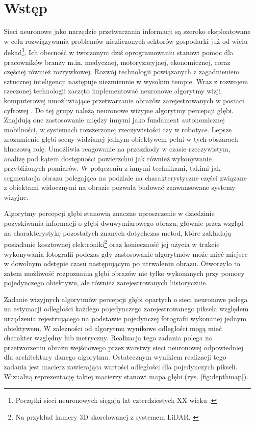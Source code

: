 \chapter{Wstęp}\label{chap:wstęp}

Sieci neuronowe jako narzędzie przetwarzania informacji są szeroko eksploatowane w celu rozwiązywania problemów niezliczonych sektorów gospodarki już od wielu dekad\footnote{Początki sieci neuronowych sięgają lat czterdziestych XX wieku \cite{mccullochpitts1943}.}. Ich obecność w tworzonym dziś oprogramowaniu stanowi pomoc dla pracowników branży m.in. medycznej, motoryzacyjnej, ekonomicznej, coraz częściej również rozrywkowej. Rozwój technologii powiązanych z zagadnieniem sztucznej inteligencji następuje niezmiennie w wysokim tempie. Wraz z rozwojem rzeczonej technologii zaczęto implementować neuronowe algorytmy wizji komputerowej umożliwiające przetwarzanie obrazów zarejestrowanych w postaci cyfrowej \cite{tadeusiewiczflasinski1991}. Do tej grupy należą neuronowe wizyjne algorytmy percepcji głębi. Znajdują one zastosowanie między innymi jako fundament autonomicznej mobilności, w systemach rozszerzonej rzeczywistości czy w robotyce. Lepsze zrozumienie głębi sceny widzianej jednym obiektywem pełni w tych obszarach kluczową rolę. Umożliwia reagowanie na przeszkody w czasie rzeczywistym, analizę pod kątem dostępności powierzchni jak również wykonywanie przybliżonych pomiarów. W połączeniu z innymi technikami, takimi jak segmentacja obrazu \cite{minaee2021} polegająca na podziale na charakterystyczne części związane z obiektami widocznymi na obrazie pozwala budować zaawansowane systemy wizyjne.

Algorytmy percepcji głębi stanowią znaczne uproszczenie w dziedzinie pozyskiwania informacji o głębi dwuwymiarowego obrazu, głównie przez wzgląd na charakterystykę pozostałych znanych dotychczas metod, które zakładają posiadanie kosztownej elektroniki\footnote{Na przykład kamery 3D skorelowanej z systemem LiDAR. \cite{dubik1989}} oraz konieczność jej użycia w trakcie wykonywania fotografii podczas gdy zastosowanie algorytmów może mieć miejsce w dowolnym odstępie czasu następującym po utrwaleniu obrazu. Otworzyło to zatem możliwość rozpoznania głębi obrazów nie tylko wykonanych przy pomocy pojedynczego obiektywu, ale również zarejestrowanych historycznie.

Zadanie wizyjnych algorytmów percepcji głębi opartych o sieci neuronowe polega na estymacji odległości każdego pojedynczego zarejestrowanego piksela względem urządzenia rejestrującego na podstawie pojedynczej fotografii wykonanej jednym obiektywem. W zależności od algorytmu wynikowe odległości mogą mieć charakter względny lub metryczny. Realizacja tego zadania polega na przetworzeniu obrazu wejściowego przez warstwy sieci neuronowej odpowiedniej dla architektury danego algorytmu. Ostatecznym wynikiem realizacji tego zadania jest macierz zawierająca wartości odległości dla pojedynczych pikseli. Wizualną reprezentację takiej macierzy stanowi mapa głębi (rys. \ref{fig:depthmap}).

